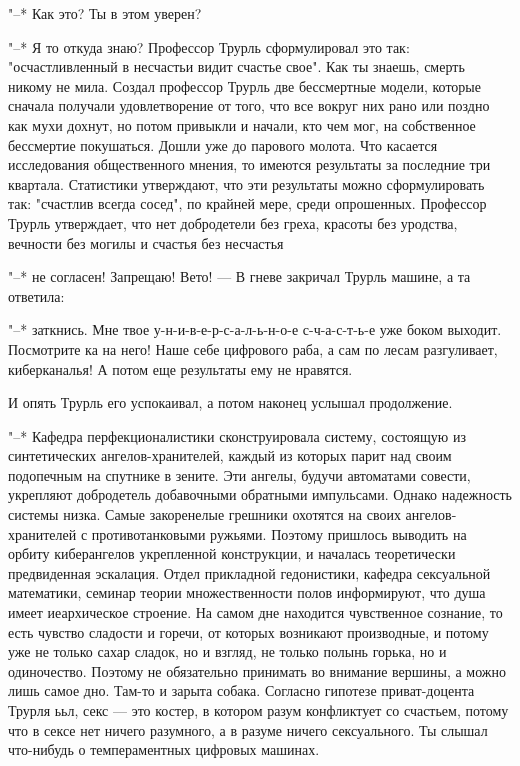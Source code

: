"--* Как это? Ты в этом уверен?

"--* Я то откуда знаю? Профессор Трурль сформулировал это
так: "осчастливленный в несчастьи видит счастье свое". Как
ты знаешь, смерть никому не мила. Создал профессор Трурль
две бессмертные модели, которые сначала получали
удовлетворение от того, что все вокруг них рано или поздно
как мухи дохнут, но потом привыкли и начали, кто чем мог, на
собственное бессмертие покушаться. Дошли уже до парового
молота. Что касается исследования общественного мнения, то
имеются результаты за последние три квартала. Статистики
утверждают, что эти результаты можно сформулировать так:
"счастлив всегда сосед", по крайней мере, среди опрошенных.
Профессор Трурль утверждает, что нет добродетели без греха,
красоты без уродства, вечности без могилы и счастья без
несчастья

"--* не согласен! Запрещаю! Вето! --- В гневе закричал
Трурль машине, а та ответила:

"--* заткнись. Мне твое у-н-и-в-е-р-с-а-л-ь-н-о-е
с-ч-а-с-т-ь-е уже боком выходит. Посмотрите ка на него! Наше
себе цифрового раба, а сам по лесам разгуливает,
киберканалья! А потом еще результаты ему не нравятся.

И опять Трурль его успокаивал, а потом наконец услышал
продолжение.

"--* Кафедра перфекционалистики сконструировала систему,
состоящую из синтетических ангелов-хранителей, каждый из
которых парит над своим подопечным на спутнике в зените. Эти
ангелы, будучи автоматами совести, укрепляют добродетель
добавочными обратными импульсами. Однако надежность системы
низка. Самые закоренелые грешники охотятся на своих
ангелов-хранителей с противотанковыми ружьями. Поэтому
пришлось выводить на орбиту киберангелов укрепленной
конструкции, и началась теоретически предвиденная эскалация.
Отдел прикладной гедонистики, кафедра сексуальной
математики, семинар теории множественности полов
информируют, что душа имеет иеархическое строение. На самом
дне находится чувственное сознание, то есть чувство сладости
и горечи, от которых возникают производные, и потому уже не
только сахар сладок, но и взгляд, не только полынь горька,
но и одиночество. Поэтому не обязательно принимать во
внимание вершины, а можно лишь самое дно. Там-то и зарыта
собака. Согласно гипотезе приват-доцента Трурля ььл, секс --- это
костер, в котором разум конфликтует со счастьем, потому
что в сексе нет ничего разумного, а в разуме ничего
сексуального. Ты слышал что-нибудь о темпераментных цифровых
машинах.

